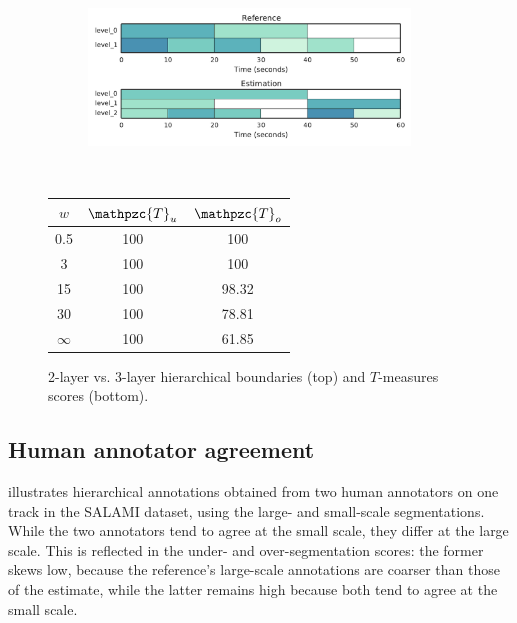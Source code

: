\documentclass{article}
\def\shag{\ensuremath{\mathpzc{T}}}
\begin{document}
\begin{figure}[t]
  \centering
  \begin{subfigure}{0.5\textwidth}
    \centering
    \includegraphics[width=0.94\textwidth]{figs/hier-hiercomp.pdf}
  \end{subfigure}%
  \\
  \begin{minipage}{0.5\textwidth}
    \centering
    \vspace{10pt}
    \begin{tabular}{|c|c|c|}
      \hline
      $w$       & $\shag_u$       & $\shag_o$      \\
      \hline
      0.5       & 100       & 100      \\     
      3         & 100       & 100      \\
      15        & 100       & 98.32    \\
      30        & 100       & 78.81    \\
      $\infty$  & 100       & 61.85    \\
      \hline
    \end{tabular}
  \end{minipage}
  \caption{2-layer vs. 3-layer hierarchical boundaries (top) and $T$-measures scores (bottom).}
  \label{fig:hier-hiercomp}
\end{figure}


\subsection{Human annotator agreement}
 illustrates hierarchical annotations obtained from two human annotators on one track in
the SALAMI dataset, using the large- and small-scale segmentations.
While the two annotators tend to agree at the small scale, they differ at the large scale.
This is reflected in the under- and over-segmentation scores: the former skews low, because the reference's large-scale annotations are coarser than those of the estimate, while the latter remains high because both tend to agree at the small scale.
\end{document}
